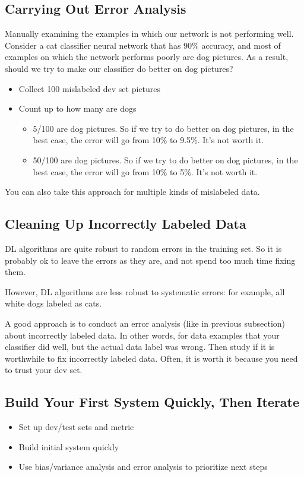 \subsection{Carrying Out Error Analysis}
Manually examining the examples in which our network is not performing well. 
Consider a cat classifier neural network that has 90\% accuracy, and most of examples on which the network performs poorly are dog pictures.
As a result, should we try to make our classifier do better on dog pictures?
\begin{itemize}
    \item Collect 100 mislabeled dev set pictures
    \item Count up to how many are dogs
    \begin{itemize}
        \item 5/100 are dog pictures. So if we try to do better on dog pictures, in the best case, the error will go from 10\% to 9.5\%. It's not worth it. 
        \item 50/100 are dog pictures. So if we try to do better on dog pictures, in the best case, the error will go from 10\% to 5\%. It's not worth it. 
    \end{itemize}
\end{itemize}

You can also take this approach for multiple kinds of mislabeled data. 

\subsection{Cleaning Up Incorrectly Labeled Data}
DL algorithms are quite robust to random errors in the training set. 
So it is probably ok to leave the errors as they are, and not spend too much time fixing them. 

However, DL algorithms are less robust to systematic errors: for example, all white dogs labeled as cats. 

A good approach is to conduct an error analysis (like in previous subsection) about incorrectly labeled data. 
In other words, for data examples that your classifier did well, but the actual data label was wrong. 
Then study if it is worthwhile to fix incorrectly labeled data. Often, it is worth it because 
you need to trust your dev set. 


\subsection{Build Your First System Quickly, Then Iterate}
\begin{itemize}
    \item Set up dev/test sets and metric
    \item Build initial system quickly
    \item Use bias/variance analysis and error analysis to prioritize next steps
\end{itemize}

